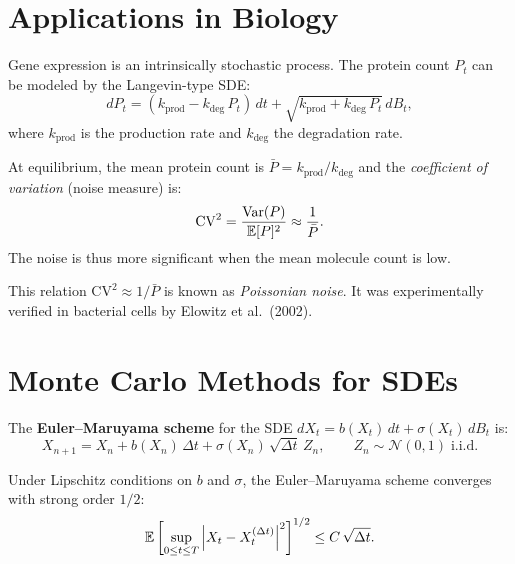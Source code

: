 \section{Applications in Biology}
\label{sec:biology}

\begin{definition}
Gene expression is an intrinsically stochastic process. The protein
count $P_t$ can be modeled by the Langevin-type SDE:
\[
  dP_t = (k_{\text{prod}} - k_{\text{deg}}\,P_t)\,dt
    + \sqrt{k_{\text{prod}} + k_{\text{deg}}\,P_t}\,dB_t,
\]
where $k_{\text{prod}}$ is the production rate and $k_{\text{deg}}$ the
degradation rate.
\end{definition}

\begin{proposition}
At equilibrium, the mean protein count is
$\bar{P} = k_{\text{prod}}/k_{\text{deg}}$ and the \emph{coefficient
of variation} (noise measure) is:
\[
  \text{CV}^2 = \frac{\mathrm{Var}(P)}{\mathbb{E}[P]^2} \approx \frac{1}{\bar{P}}.
\]
The noise is thus more significant when the mean molecule count is low.
\end{proposition}

\begin{remark}
This relation $\text{CV}^2 \approx 1/\bar{P}$ is known as
\emph{Poissonian noise}. It was experimentally
verified in bacterial cells by Elowitz et al.\ (2002).
\end{remark}

\section{Monte Carlo Methods for SDEs}
\label{sec:mc_sde}

\begin{definition}
The \textbf{Euler--Maruyama scheme} for the SDE
$dX_t = b(X_t)\,dt + \sigma(X_t)\,dB_t$ is:
\[
  X_{n+1} = X_n + b(X_n)\,\Delta t + \sigma(X_n)\,\sqrt{\Delta t}\,Z_n,
  \qquad Z_n \sim \mathcal{N}(0,1)\;\text{i.i.d.}
\]
\end{definition}

\begin{theorem}
Under Lipschitz conditions on $b$ and $\sigma$, the Euler--Maruyama
scheme converges with strong order $1/2$:
\[
  \mathbb{E}\left[\sup_{0 \leq t \leq T}
  \left| X_t - X_t^{(\Delta t)} \right|^2\right]^{1/2} \leq C\,\sqrt{\Delta t}.
\]
\end{theorem}

